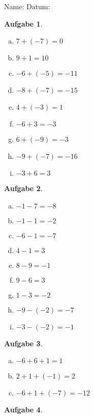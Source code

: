 \documentclass[12pt,fleqn]{article}
\theoremstyle{aufg}
\newtheorem{aufgabe}{Aufgabe}
\theoremstyle{bsp}
\begin{document}
 
    \begin{flushleft}
Name: \hspace{12cm} Datum:\begin{aufgabe} ~ \\ 
\begin{multicols}{3} 
\begin{enumerate}[a)] 
\item 
$7+(-7)=0$
\item 
$9+1=10$
\item 
$-6+(-5)=-11$
\item 
$-8+(-7)=-15$
\item 
$4+(-3)=1$
\item 
$-6+3=-3$
\item 
$6+(-9)=-3$
\item 
$-9+(-7)=-16$
\item 
$-3+6=3$
\end{enumerate} 
\end{multicols} 
\end{aufgabe} 
\begin{aufgabe} ~ \\ 
\begin{multicols}{3} 
\begin{enumerate}[a)] 
\item 
$-1-7=-8$
\item 
$-1-1=-2$
\item 
$-6-1=-7$
\item 
$4-1=3$
\item 
$8-9=-1$
\item 
$9-6=3$
\item 
$1-3=-2$
\item 
$-9-(-2)=-7$
\item 
$-3-(-2)=-1$
\end{enumerate} 
\end{multicols} 
\end{aufgabe} 
\begin{aufgabe} ~ \\ 
\begin{multicols}{3} 
\begin{enumerate}[a)] 
\item 
$-6+6+1=1$
\item 
$2+1+(-1)=2$
\item 
$-6+1+(-7)=-12$
\end{enumerate} 
\end{multicols} 
\end{aufgabe} 
\begin{aufgabe} ~ \\ 

\end{aufgabe}
\end{flushleft}
\end{document}
